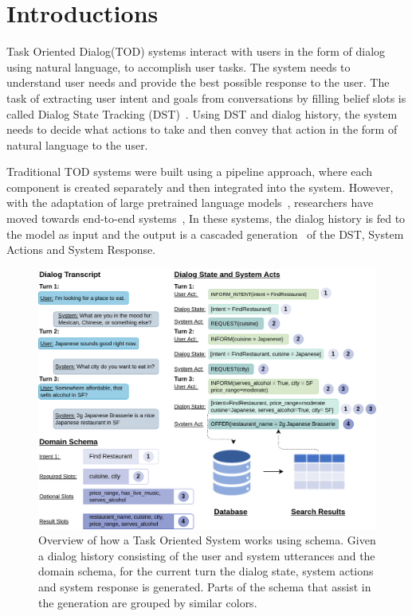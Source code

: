\section{Introductions}

Task Oriented Dialog(TOD) systems interact with users in the form of dialog using natural language, to accomplish user tasks.
The system needs to understand user needs and provide the best possible response to the user.
The task of extracting user intent and goals from conversations by filling belief slots is called Dialog State Tracking (DST)~\cite{wang-etal-2016-inner}.
Using DST and dialog history, the system needs to decide what actions to take and then convey that action in the form of natural language to the user.

Traditional TOD systems were built using a pipeline approach, where each component is created separately and then integrated into the system.
However, with the adaptation of large pretrained language models~\cite{Devlin2019BERTPO,Radford2019LanguageMA},
researchers have moved towards end-to-end systems~\cite{HosseiniAsl2020ASL,Peng2021SoloistBT,Lee2020SUMBTLaRLEN,Yang2020UBARTF,Jeon2021DORATP,Sun2022BORTBA,Yang2022UBARv2TM},
In these systems, the dialog history is fed to the model as input and the output is a cascaded generation~\cite{su2021multi} of the DST, System Actions and System Response.

\begin{figure}[!t]
    \centering
    \includegraphics[width=\linewidth]{assets/approach.png}
    \caption{
        Overview of how a Task Oriented System works using schema.
        Given a dialog history consisting of the user and system utterances and the domain schema, for the current turn the dialog state, system actions and system response is generated.
        Parts of the schema that assist in the generation are grouped by similar colors.
    }
    \label{fig:approach}
\end{figure}

